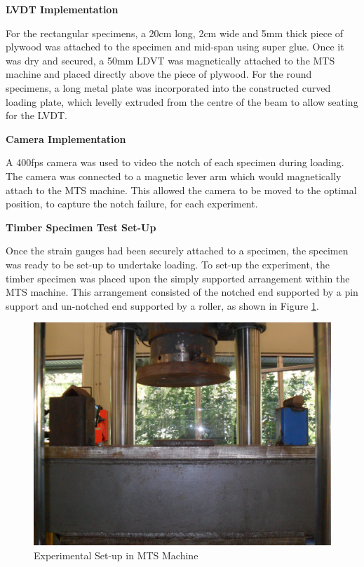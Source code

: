 \documentclass[11pt,a4paper]{article}
\numberwithin{equation}{subsection}
\begin{document}
\vspace*{\baselineskip}

\noindent
\textbf{LVDT Implementation}\par
\noindent
For the rectangular specimens, a 20cm long, 2cm wide and 5mm thick piece of plywood was attached to the specimen and mid-span using super glue. Once it was dry and secured, a 50mm LDVT was magnetically attached to the MTS machine and placed directly above the piece of plywood. For the round specimens, a long metal plate was incorporated into the constructed curved loading plate, which levelly extruded from the centre of the beam to allow seating for the LVDT.

\vspace*{\baselineskip}

\noindent
\textbf{Camera Implementation}\par
\noindent
A 400fps camera was used to video the notch of each specimen during loading. The camera was connected to a magnetic lever arm which would magnetically attach to the MTS machine. This allowed the camera to be moved to the optimal position, to capture the notch failure, for each experiment.

\vspace*{\baselineskip}

\noindent
\textbf{Timber Specimen Test Set-Up}\par
\noindent
Once the strain gauges had been securely attached to a specimen, the specimen was ready to be set-up to undertake loading. To set-up the experiment, the timber specimen was placed upon the simply supported arrangement within the MTS machine. This arrangement consisted of the notched end supported by a pin support and un-notched end supported by a roller, as shown in Figure \ref{fig:set_up}.

\begin{figure}[h]
	\begin{center}
		\includegraphics[scale=0.1]{MTS_Set-up}
	\end{center}
	\caption{Experimental Set-up in MTS Machine}
	\label{fig:set_up}
\end{figure}
\pagebreak
\end{document}
